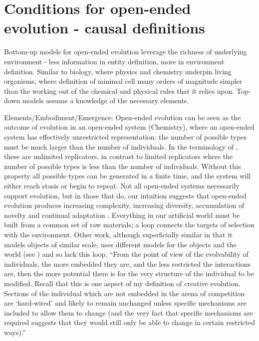 \section{Conditions for open-ended evolution - causal definitions}

Bottom-up models for open-ended evolution leverage the richness of underlying environment - less information in entity definition, more in environment definition. Similar to biology, where physics and chemistry underpin living organisms, where definition of minimal cell many orders of magnitude simpler than the working out of the chemical and physical rules that it relies upon. Top-down models assume a knowledge of the necessary elements.

Elements/Embodiment/Emergence:
Open-ended evolution can be seen as the outcome of evolution in an open-ended system (\eg Chemistry), where an open-ended system has effectively unrestricted representation: the number of possible types must be much larger than the number of individuals. In the terminology of \cite{Szathmary:2006ty}, these are unlimited replicators, in contrast to limited replicators where the number of possible types is less than the number of individuals. Without this property all possible types can be generated in a finite time, and the system will either reach stasis or begin to repeat. Not all open-ended systems necessarily support evolution, but in those that do, our intuition suggests that open-ended evolution produces increasing complexity, increasing diversity, accumulation of novelty and continual adaptation \parencite{Lehman2012}.
Everything in our artificial world must be built from a common set of raw materials; a loop connects the targets of selection with the environment. Other work, although superficially similar in that it models objects of similar scale, uses different models for the objects and the world (see \parencite{Sanchez-Dehesa:2008uq}) and so lack this loop.
``From the point of view of the evolvability of individuals, the more embedded they are, and the less restricted the interactions are, then the more potential there is for the very structure of the individual to be modified. Recall that this is one aspect of my definition of creative evolution. Sections of the individual which are not embedded in the arena of competition are `hard-wired' and
likely to remain unchanged unless specific mechanisms are included to allow them to change (and the very fact that specific mechanisms are required suggests that they would still only be able to change in certain restricted ways).'' \cite{Taylor2001}
